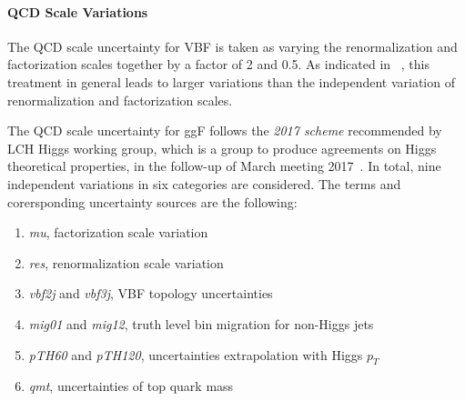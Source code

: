 % 

\paragraph{QCD Scale Variations}

The QCD scale uncertainty for VBF is taken as varying the renormalization
and factorization scales together by a factor of 2 and 0.5. As indicated in ~\cite{QCDscale_vbf}, 
this treatment in general leads to larger variations than the independent variation of renormalization
and factorization scales. 

The QCD scale uncertainty for ggF follows the \textit{2017 scheme} recommended by 
LCH Higgs working group, which is a group to produce agreements on Higgs theoretical properties,
in the follow-up of March meeting 2017~\cite{QCDscale_ggF}. In total, nine independent 
variations in six categories are considered. The terms and corersponding uncertainty sources 
are the following:

\begin{enumerate}
\item \textit{mu}, factorization scale variation
\item \textit{res}, renormalization scale variation
\item \textit{vbf2j} and \textit{vbf3j}, VBF topology uncertainties
\item \textit{mig01} and \textit{mig12}, truth level bin migration for non-Higgs jets
\item \textit{pTH60} and \textit{pTH120}, uncertainties extrapolation with Higgs $p_T$
\item \textit{qmt}, uncertainties of top quark mass
\end{enumerate}



